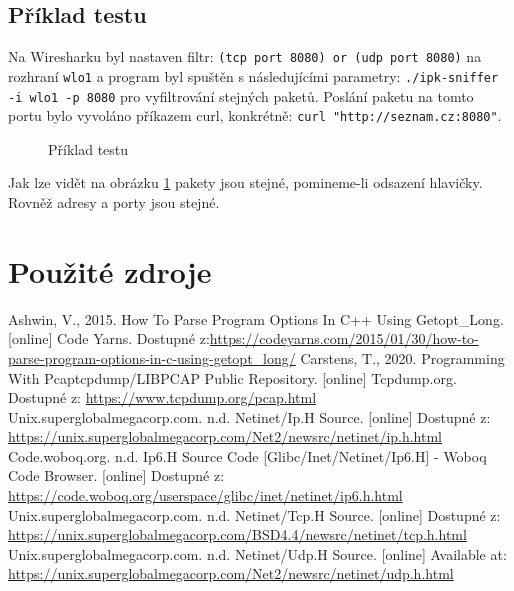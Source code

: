 \documentclass[a4paper, 12pt, titlepage]{article}
\begin{document}
\subsection{Příklad testu}
Na Wiresharku byl nastaven filtr: \verb|(tcp port 8080) or (udp port 8080)| na rozhraní \verb|wlo1| a program byl spuštěn s následujícími parametry: \verb|./ipk-sniffer -i wlo1 -p 8080| pro vyfiltrování stejných paketů. Poslání paketu na tomto portu bylo vyvoláno příkazem curl, konkrétně: \verb|curl "http://seznam.cz:8080"|.

\begin{figure}[H]
    \centering
    \caption{Příklad testu}
    \label{obrazek 3}
\end{figure}

Jak lze vidět na obrázku \ref{obrazek 3} pakety jsou stejné, pomineme-li odsazení hlavičky. Rovněž adresy a porty jsou stejné.

\newpage
\section{Použité zdroje}
\begin{thebibliography}{99}
 Ashwin, V., 2015. How To Parse Program Options In C++ Using Getopt\_Long. [online] Code Yarns. Dostupné z:\url{https://codeyarns.com/2015/01/30/how-to-parse-program-options-in-c-using-getopt\_long/}
 Carstens, T., 2020. Programming With Pcaptcpdump/LIBPCAP Public Repository. [online] Tcpdump.org. Dostupné z: \url{https://www.tcpdump.org/pcap.html}
 Unix.superglobalmegacorp.com. n.d. Netinet/Ip.H Source. [online] Dostupné z: \url{https://unix.superglobalmegacorp.com/Net2/newsrc/netinet/ip.h.html}
 Code.woboq.org. n.d. Ip6.H Source Code [Glibc/Inet/Netinet/Ip6.H] - Woboq Code Browser. [online] Dostupné z: \url{https://code.woboq.org/userspace/glibc/inet/netinet/ip6.h.html}
 Unix.superglobalmegacorp.com. n.d. Netinet/Tcp.H Source. [online] Dostupné z: \url{https://unix.superglobalmegacorp.com/BSD4.4/newsrc/netinet/tcp.h.html}
 Unix.superglobalmegacorp.com. n.d. Netinet/Udp.H Source. [online] Available at: \url{https://unix.superglobalmegacorp.com/Net2/newsrc/netinet/udp.h.html}
\end{thebibliography}
\end{document}
